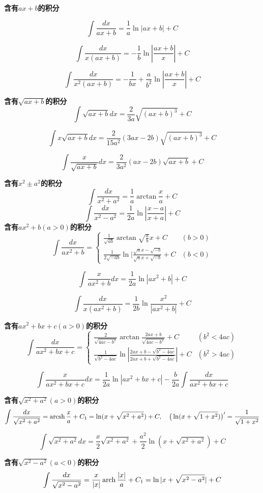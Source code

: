 \documentclass{article}
\begin{document}
\textbf{含有$ax+b$的积分}

$$
\int \frac{dx}{ax+b}=\frac{1}{a}\ln|ax+b|+C
$$

$$
\int \frac{dx}{x(ax+b)}=-\frac{1}{b}\ln|\frac{ax+b}{x}|+C
$$

$$
\int \frac{dx}{x^2(ax+b)}=-\frac{ 1}{bx}+\frac{ a}{b^2}\ln |\frac{ax+b}{x}|+C
$$

\textbf{含有$\sqrt{ax+b}$的积分}
$$
\int \sqrt{ax+b}dx=\frac{2}{3a}\sqrt{(ax+b)^3}+C
$$

$$
\int x\sqrt{ax+b}dx=\frac{2}{15a^2}(3ax-2b)\sqrt{(ax+b)^3}+C
$$

$$
\int \frac{x}{\sqrt{ax+b}}dx=\frac{2}{3a^2}(ax-2b)\sqrt{ax+b}+C
$$

\textbf{含有$x^2 \pm a^2$的积分}
$$
\int \frac{dx}{x^2+a^2}=\frac{1}{a}\arctan \frac{x}{a}+C
$$
$$
\int \frac{dx}{x^2-a^2}=\frac{1}{2a}\ln |\frac{x-a}{x+a}|+C
$$
\textbf{含有$ax^2+b(a>0)$的积分}
$$
\int \frac{dx}{ax^2+b}=
\left\{
		\begin{array}{ll}
			\frac{1}{\sqrt{ab}}\arctan \sqrt{\frac{a}{b}}x+C & (b>0) \\
			\frac{1}{2\sqrt{-ab}}\ln|\frac{\sqrt{a}x-\sqrt{-b}}{\sqrt{a}x+\sqrt{-b}}+C & (b<0)
		\end{array}
		\right.
$$

$$
\int \frac{x}{ax^2+b}dx=\frac{1}{2a}\ln |ax^2+b|+C
$$

$$
\int \frac{dx}{x(ax^2+b)}=\frac{1}{2b}\ln \frac{x^2}{|ax^2+b|}+C
$$

\textbf{含有$ax^2+bx+c(a>0)$的积分}
$$
\int \frac{ dx}{ax^2+bx+c}=
\left\{
		\begin{array}{ll}
		 \frac{2}{\sqrt{4ac-b^2}}\arctan \frac{2ax+b}{\sqrt{4ac-b^2}}+C & (b^2<4ac) \\
		 \frac{1}{\sqrt{b^2-4ac}}\ln|\frac{2ax+b-\sqrt{b^2-4ac}}{2ax+b+\sqrt{b^2-4ac}}|+C & (b^2>4ac)
		\end{array}
		\right.
$$

$$
\int \frac{x}{ax^2+bx+c}dx=\frac{1}{2a}\ln|ax^2+bx+c|-\frac{b}{2a}\int \frac{dx}{ax^2+bx+c}
$$

\textbf{含有$\sqrt{x^2+a^2}(a>0)$的积分}
$$
\int \frac{dx}{\sqrt{x^2+a^2}}=\operatorname{arcsh} \frac{x}{a}+C_1=\ln(x+\sqrt{x^2+a^2})+C,\quad \big( \ln(x+\sqrt{1+x^2})\big)'=\frac{1}{\sqrt{1+x^2}}
$$

$$
\int \sqrt{x^2+a^2}dx=\frac{x}{2}\sqrt{x^2+a^2}+\frac{a^2}{2}\ln(x+\sqrt{x^2+a^2})+C
$$

\textbf{含有$\sqrt{x^2-a^2}(a<0)$的积分}
$$
\int \frac{dx}{\sqrt{x^2-a^2}}=\frac{x}{|x|}\operatorname{arch} \frac{|x|}{a}+C_1=
\ln|x+\sqrt{x^2-a^2}|+C
$$
\end{document}
